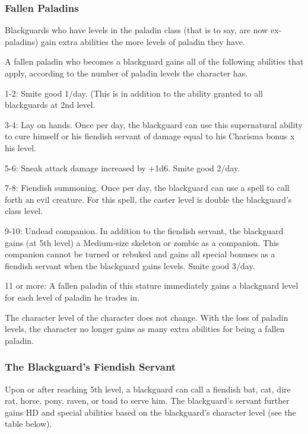 \subsubsection{Fallen Paladins}

Blackguards who have levels in the paladin class (that is to say, are now ex-paladins) 
gain extra abilities the more levels of paladin they have.

A fallen paladin who becomes a blackguard gains all of the following abilities 
that apply, according to the number of paladin levels the character has.

1-2: Smite good 1/day. (This is in addition to the ability granted to all blackguards 
at 2nd level.

3-4: Lay on hands. Once per day, the blackguard can use this supernatural ability 
to cure himself or his fiendish servant of damage equal to his Charisma bonus x 
his level.

5-6: Sneak attack damage increased by +1d6. Smite good 2/day.

7-8: Fiendish summoning. Once per day, the blackguard can use a  spell to call forth an evil creature. For this spell, the caster level 
is double the blackguard's class level.

9-10: Undead companion. In addition to the fiendish servant, the blackguard gains 
(at 5th level) a Medium-size skeleton or zombie as a companion. This companion 
cannot be turned or rebuked and gains all special bonuses as a fiendish servant 
when the blackguard gains levels. Smite good 3/day.

11 or more: A fallen paladin of this stature immediately gains a blackguard level 
for each level of paladin he trades in. 

The character level of the character does not change. With the loss of paladin 
levels, the character no longer gains as many extra abilities for being a fallen 
paladin. 

\subsubsection{The Blackguard's Fiendish Servant}

Upon or after reaching 5th level, a blackguard can call a fiendish bat, cat, dire 
rat, horse, pony, raven, or toad to serve him. The blackguard's servant further 
gains HD and special abilities based on the blackguard's character level (see the 
table below).

